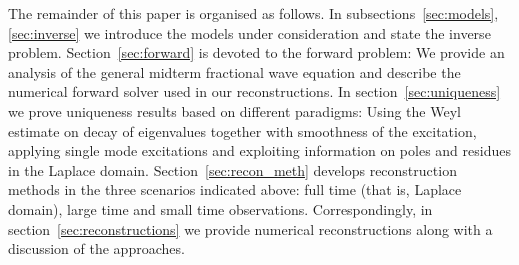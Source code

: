 The remainder of this paper is organised as follows.
In subsections~\ref{sec:models}, \ref{sec:inverse} we introduce the models under consideration and state the inverse problem.
Section~\ref{sec:forward} is devoted to the forward problem: We provide an analysis of the general midterm fractional wave equation and describe the numerical forward solver used in our reconstructions.
In section~\ref{sec:uniqueness} we prove uniqueness results based on different paradigms: Using the Weyl estimate on decay of eigenvalues together with smoothness of the excitation, applying single mode excitations and exploiting information on poles and residues in the Laplace domain.
Section~\ref{sec:recon_meth} develops reconstruction methods in the three scenarios indicated above: full time (that is, Laplace domain), large time and small time observations. 
Correspondingly, in section~\ref{sec:reconstructions} we provide numerical reconstructions along with a discussion of the approaches.



%
